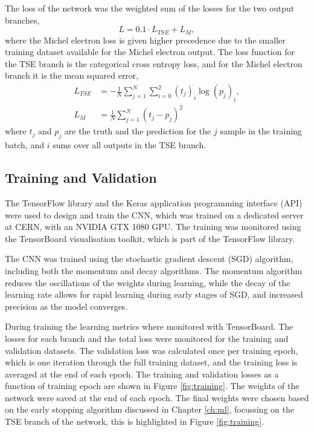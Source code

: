 The loss of the network was the weighted sum of the losses for the two output
branches,
\begin{equation*}
	L = 0.1 \cdot L_{TSE} + L_M,
\end{equation*}
where the Michel electron loss is given higher precedence due to the smaller
training dataset available for the Michel electron output. The loss function for
the TSE branch is the categorical cross entropy 
loss\cite{750fabedbacb467c8fafd98b87f77436}, and for the Michel electron branch
it is the mean squared error\cite{mse_springer},
\begin{align*}
	L_{TSE} &= - \frac{1}{N} \sum_{j=1}^N \sum_{i=0}^2 (t_j)_i \log (p_j)_i, \\
	L_M &= \frac{1}{N} \sum_{j=1}^N (t_j - p_j)^2
\end{align*}
where $t_j$ and $p_j$ are the truth and the prediction for the $j$ sample in the
training batch, and $i$ sums over all outputs in the TSE branch. 

\subsection{Training and Validation}
The TensorFlow\cite{45381} library and the Keras\cite{chollet2015keras} 
application programming interface (API) were used to design and train the CNN, 
which was trained on a dedicated \protodune{} server at CERN, with an NVIDIA 
GTX 1080 GPU. The training was monitored using the TensorBoard visualisation 
toolkit, which is part of the TensorFlow library. 

The CNN was trained using the stochastic gradient descent (SGD)
algorithm, including both the momentum and decay 
algorithms\cite{Reed1999}. The momentum algorithm reduces the oscillations of
the weights during learning, while the decay of the learning rate allows for
rapid learning during early stages of SGD, and increased precision as the model
converges. 

During training the learning metrics where monitored with TensorBoard. The
losses for each branch and the total loss were monitored for the training
and validation datasets. The validation loss was calculated once per training
epoch, which is one iteration through the full training dataset, and the
training loss is averaged at the end of each epoch. The training and validation
losses as a function of training epoch are shown in Figure \ref{fig:training}.
The weights of the network were saved at the end of each epoch. The final
weights were chosen based on the early stopping algorithm discussed in Chapter
\ref{ch:ml}, focussing on the TSE branch of the network, this is highlighted 
in Figure \ref{fig:training}.

